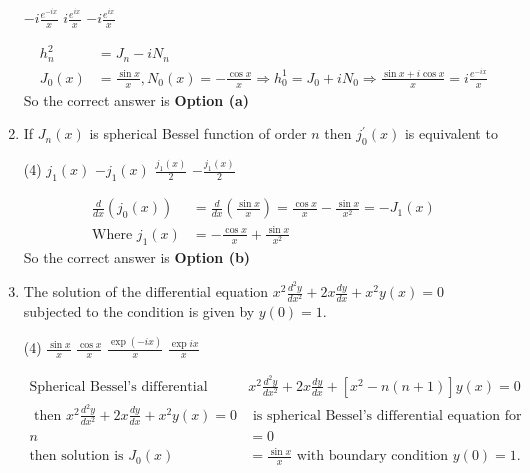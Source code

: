 \begin{enumerate}[label=\color{ocre}\textbf{\arabic*.}]
\begin{tasks}
	\task[\textbf{b.}] $-i \frac{e^{-i x}}{x}$
	\task[\textbf{c.}]$i \frac{e^{i x}}{x}$
	\task[\textbf{d.}] $-i \frac{e^{i x}}{x}$
\end{tasks}
\begin{answer}
	\begin{align*}
	h_{n}^{2}&=J_{n}-i N_{n}\\
	J_{0}(x)&=\frac{\sin x}{x},N_{0}(x)=-\frac{\cos x}{x} \Rightarrow h_{0}^{1}=J_{0}+i N_{0} \Rightarrow \frac{\sin x+i \cos x}{x}=i \frac{e^{-i x}}{x}
	\end{align*}
		So the correct answer is \textbf{Option (a)}
\end{answer}
\item If $J_{n}(x)$ is spherical Bessel function of order $n$ then $j_{0}^{\prime}(x)$ is equivalent to
 \begin{tasks}(4)
	\task[\textbf{a.}]$j_{1}(x)$
	\task[\textbf{b.}]$-j_{1}(x)$
	\task[\textbf{c.}]$\frac{j_{1}(x)}{2}$
	\task[\textbf{d.}]$-\frac{j_{1}(x)}{2}$
\end{tasks}
\begin{answer}
	\begin{align*}
	\frac{d}{d x}\left(j_{0}(x)\right)&=\frac{d}{d x}\left(\frac{\sin x}{x}\right)=\frac{\cos x}{x}-\frac{\sin x}{x^{2}}=-J_{1}(x)\\
	\text{Where }j_{1}(x)&=-\frac{\cos x}{x}+\frac{\sin x}{x^{2}}
	\end{align*}
	So the correct answer is \textbf{Option (b)}
\end{answer}
\item The solution of the differential equation $x^{2} \frac{d^{2} y}{d x^{2}}+2 x \frac{d y}{d x}+x^{2} y(x)=0$ subjected to the condition is given by $y(0)=1$.
 \begin{tasks}(4)
	\task[\textbf{a.}] $\frac{\sin x}{x}$
	\task[\textbf{b.}] $\frac{\cos x}{x}$
	\task[\textbf{c.}]$\frac{\exp (-i x)}{x}$
	\task[\textbf{d.}] $\frac{\exp i x}{x}$
\end{tasks}
\begin{answer}
	\begin{align*}
 \text{Spherical Bessel's differential equation }&x^{2} \frac{d^{2} y}{d x^{2}}+2 x \frac{d y}{d x}+\left[x^{2}-n(n+1)\right] y(x)=0\\
 \text{ then }x^{2} \frac{d^{2} y}{d x^{2}}+2 x \frac{d y}{d x}+x^{2} y(x)=0 &\text{ is spherical Bessel's differential equation for order}\\
 n&=0\\
	\text{then solution is }J_{0}(x)&=\frac{\sin x}{x}\text{ with boundary condition }y(0)=1.

\end{align*}
\end{answer}
\end{enumerate}
